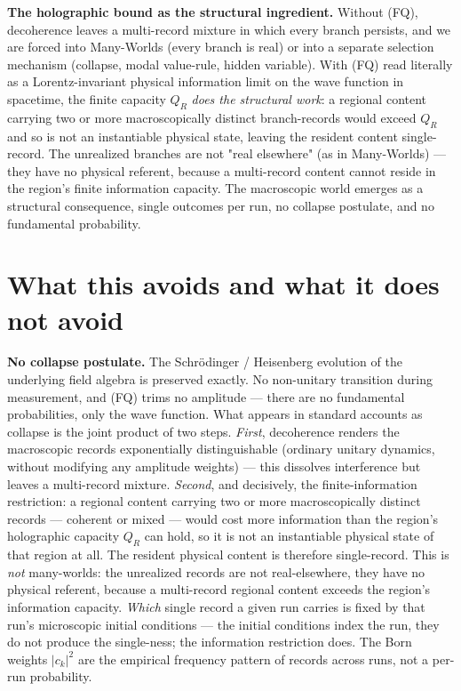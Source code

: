 \documentclass[11pt,a4paper]{article}
\begin{document}
\textbf{The holographic bound as the structural ingredient.} Without (FQ), decoherence leaves a multi-record mixture in which every branch persists, and we are forced into Many-Worlds (every branch is real) or into a separate selection mechanism (collapse, modal value-rule, hidden variable). With (FQ) read literally as a Lorentz-invariant physical information limit on the wave function in spacetime, the finite capacity $Q_R$ \emph{does the structural work}: a regional content carrying two or more macroscopically distinct branch-records would exceed $Q_R$ and so is not an instantiable physical state, leaving the resident content single-record. The unrealized branches are not "real elsewhere" (as in Many-Worlds) — they have no physical referent, because a multi-record content cannot reside in the region's finite information capacity. The macroscopic world emerges as a structural consequence, single outcomes per run, no collapse postulate, and no fundamental probability.

\section{What this avoids and what it does not avoid}

\textbf{No collapse postulate.} The Schrödinger / Heisenberg evolution of the underlying field algebra is preserved exactly. No non-unitary transition during measurement, and (FQ) trims no amplitude — there are no fundamental probabilities, only the wave function. What appears in standard accounts as collapse is the joint product of two steps. \emph{First}, decoherence renders the macroscopic records exponentially distinguishable (ordinary unitary dynamics, without modifying any amplitude weights) — this dissolves interference but leaves a multi-record mixture. \emph{Second}, and decisively, the finite-information restriction: a regional content carrying two or more macroscopically distinct records — coherent or mixed — would cost more information than the region's holographic capacity $Q_R$ can hold, so it is not an instantiable physical state of that region at all. The resident physical content is therefore single-record. This is \emph{not} many-worlds: the unrealized records are not real-elsewhere, they have no physical referent, because a multi-record regional content exceeds the region's information capacity. \emph{Which} single record a given run carries is fixed by that run's microscopic initial conditions — the initial conditions index the run, they do not produce the single-ness; the information restriction does. The Born weights $|c_k|^2$ are the empirical frequency pattern of records across runs, not a per-run probability.
\end{document}
